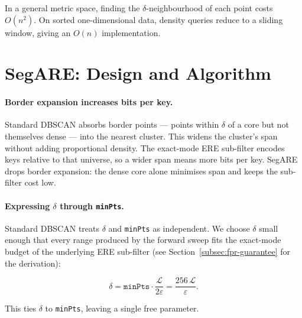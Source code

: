 In a general metric space, finding the $\delta$-neighbourhood of each point costs $O(n^2)$.
On sorted one-dimensional data, density queries reduce to a sliding window, giving an
$O(n)$ implementation.


\section{SegARE: Design and Algorithm}
\label{sec:hybrid-scan}

\paragraph{Border expansion increases bits per key.}
Standard DBSCAN absorbs border points --- points within $\delta$ of a core but not
themselves dense --- into the nearest cluster.
This widens the cluster's span without adding proportional density.
The exact-mode ERE sub-filter encodes keys relative to that universe, so a wider span
means more bits per key.
SegARE drops border expansion: the dense core alone minimises span and keeps the
sub-filter cost low.

\paragraph{Expressing $\delta$ through \texttt{minPts}.}
Standard DBSCAN treats $\delta$ and \texttt{minPts} as independent.
We choose $\delta$ small enough that every range produced by the forward sweep
fits the exact-mode budget of the underlying ERE sub-filter
(see Section~\ref{subsec:fpr-guarantee} for the derivation):

\begin{equation}
    \delta = \texttt{minPts} \cdot \frac{\mathcal{L}}{2\varepsilon} = \frac{256\,\mathcal{L}}{\varepsilon}.
    \label{eq:delta}
\end{equation}

This ties $\delta$ to \texttt{minPts}, leaving a single free parameter.

